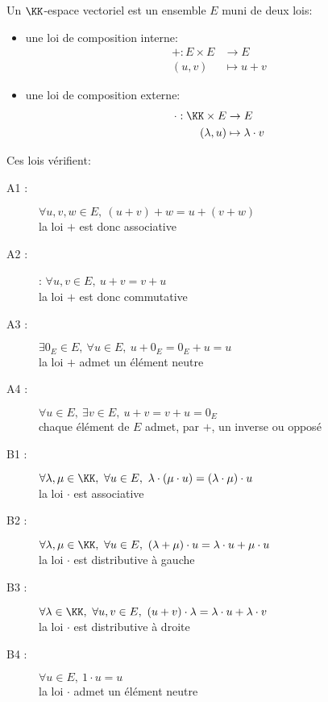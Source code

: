 \documentclass[../main.tex]{subfile}
\begin{document}
\begin{defi}
	Un $\KK$-espace vectoriel est un ensemble $E$ muni de deux lois:\\
\begin{itemize}
	\item une loi de composition interne:
	$$
\begin{aligned}
	+ : E \times E &\to E \\
	(u,v) &\mapsto u + v
\end{aligned}
	$$

	\item une loi de composition externe:
	$$
\begin{aligned}
	\cdot : \KK \times E &\to E \\
	(\lambda, u) &\mapsto \lambda \cdot v
\end{aligned}
	$$
\end{itemize}
	Ces lois vérifient:
\begin{description}
	\item[A1 :] $\forall u, v, w \in E, \ (u + v) + w = u + (v + w)$ \\
	la loi $+$ est donc associative

	\item[A2 :] : $\forall u, v \in E, \ u + v = v + u$\\
	la loi $+$ est donc commutative

	\item[A3 :] $\exists 0_E \in E, \ \forall u \in E, \ u + 0_E = 0_E + u = u$\\
	la loi $+$ admet un élément neutre

	\item[A4 :] $\forall u \in E, \ \exists v \in E, \ u+v = v+u = 0_E$\\
	chaque élément de $E$ admet, par $+$, un inverse ou opposé

	\item[B1 :] $\forall \lambda, \mu \in \KK, \ \forall u \in E, \ \lambda \cdot (\mu \cdot u) = (\lambda \cdot \mu) \cdot u$\\
	la loi $\cdot$ est associative

	\item[B2 :] $\forall \lambda, \mu \in \KK, \ \forall u \in E, \ (\lambda + \mu) \cdot u = \lambda \cdot u + \mu \cdot u$\\
	la loi $\cdot$ est distributive à gauche

	\item[B3 :] $\forall \lambda \in \KK, \ \forall u, v \in E, \ (u + v) \cdot \lambda = \lambda \cdot u + \lambda \cdot v $\\
	la loi $\cdot$ est distributive à droite

	\item[B4 :] $\forall u \in E, \ 1 \cdot u = u$\\
	la loi $\cdot$ admet un élément neutre
\end{description}
\end{defi}
\end{document}
